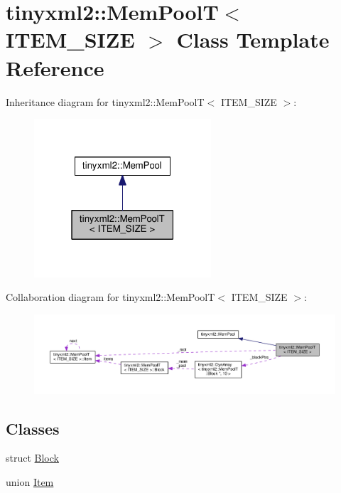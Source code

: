 \hypertarget{classtinyxml2_1_1MemPoolT}{}\section{tinyxml2\+:\+:Mem\+PoolT$<$ I\+T\+E\+M\+\_\+\+S\+I\+ZE $>$ Class Template Reference}
\label{classtinyxml2_1_1MemPoolT}


Inheritance diagram for tinyxml2\+:\+:Mem\+PoolT$<$ I\+T\+E\+M\+\_\+\+S\+I\+ZE $>$\+:
\nopagebreak
\begin{figure}[H]
\begin{center}
\leavevmode
\includegraphics[width=187pt]{classtinyxml2_1_1MemPoolT__inherit__graph}
\end{center}
\end{figure}


Collaboration diagram for tinyxml2\+:\+:Mem\+PoolT$<$ I\+T\+E\+M\+\_\+\+S\+I\+ZE $>$\+:
\nopagebreak
\begin{figure}[H]
\begin{center}
\leavevmode
\includegraphics[width=350pt]{classtinyxml2_1_1MemPoolT__coll__graph}
\end{center}
\end{figure}
\subsection*{Classes}
\begin{DoxyCompactItemize}
\item 
struct \hyperlink{structtinyxml2_1_1MemPoolT_1_1Block}{Block}
\item 
union \hyperlink{uniontinyxml2_1_1MemPoolT_1_1Item}{Item}
\end{DoxyCompactItemize}
